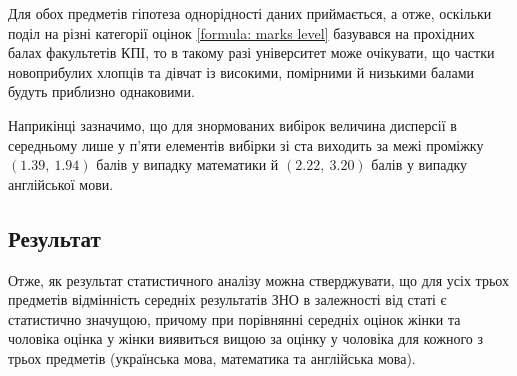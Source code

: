 \documentclass[a4paper,14pt]{extarticle} %
\numberwithin{equation}{section}
\begin{document}
Для обох предметів гіпотеза однорідності даних приймається, а отже, оскільки поділ на різні категорії оцінок 
\eqref{formula: marks level} базувався на прохідних балах факультетів КПІ, то в такому разі університет може 
очікувати, що частки новоприбулих хлопців та дівчат із високими, помірними й низькими балами будуть приблизно 
однаковими.

Наприкінці зазначимо, що для знормованих вибірок величина дисперсії в середньому лише у п'яти елементів 
вибірки зі ста виходить за межі проміжку $(1.39,\ 1.94)$ балів у випадку математики й $(2.22,\ 3.20)$ балів у 
випадку англійської мови.

\subsection*{Результат}

Отже, як результат статистичного аналізу можна стверджувати, що для усіх трьох предметів відмінність середніх 
результатів ЗНО в залежності від статі є статистично значущою, причому при порівнянні середніх оцінок жінки 
та чоловіка оцінка у жінки виявиться вищою за оцінку у чоловіка для кожного з трьох предметів (українська мова, 
математика та англійська мова).
\end{document}
